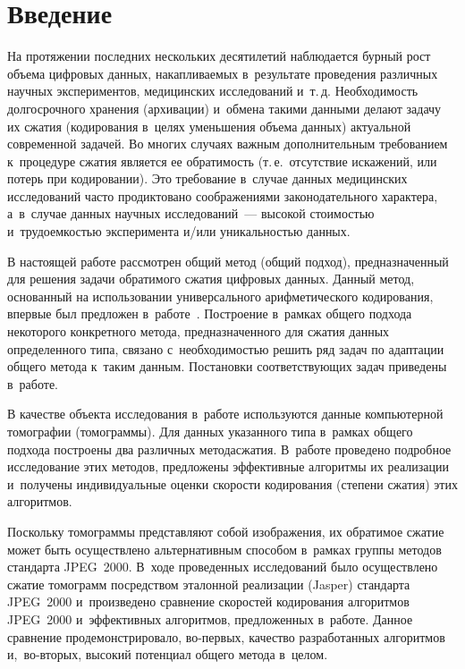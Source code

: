 


\thispagestyle{headings}

\begin{multicols}{2}

\label{st\stat}

\section{Введение}

На протяжении последних нескольких десятилетий наблюдается бурный рост 
объема цифровых данных, накапливаемых в~результате проведения различных 
научных экспериментов, медицинских исследований и~т.\,д. Необходимость долгосрочного 
хранения (архивации) и~обмена такими данными делают задачу их сжатия (кодирования 
в~целях уменьшения объема данных) актуальной современной задачей. Во 
многих случаях важным дополнительным требованием к~процедуре сжатия является 
ее обратимость (т.\,е.\ отсутствие искажений, или потерь при кодировании). 
Это требование в~случае данных медицинских исследований часто продиктовано 
соображениями законодательного характера, а~в~случае данных научных исследований~--- 
высокой стоимостью и~трудоемкостью эксперимента и/или уникальностью данных.

В настоящей работе рассмотрен общий метод (общий подход), 
предназначенный для решения задачи обратимого сжатия цифровых данных. 
Данный метод, основанный на использовании универсального арифметического 
кодирования, впервые был предложен в~работе~\cite{b01}. Построение в~рамках 
общего подхода некоторого конкретного метода, предназначенного для сжатия 
данных определенного типа, связано с~необходимостью решить ряд задач по 
адаптации общего метода к~таким данным. Постановки соответствующих задач 
приведены в~работе.

В качестве объекта исследования в~работе используются данные компьютерной 
томографии (томограммы). Для данных указанного типа в~рамках общего подхода 
построены два различных метода\linebreak сжатия. В~работе проведено подробное 
исследова\-ние этих методов, предложены эффективные алго\-ритмы их реализации и~получены 
индивидуальные оценки скорости кодирования (степени сжатия) этих алгоритмов.

Поскольку томограммы представляют собой изображения, их обратимое сжатие может 
быть осуществлено альтернативным способом в~рамках группы методов стандарта JPEG~2000. 
В~ходе проведенных исследований было осуществлено сжатие томограмм посредством 
эталонной реализации (Jasper) стандарта JPEG~2000 и~произведено сравнение 
скоростей кодирования алгоритмов JPEG~2000 и~эффективных алгоритмов, предложенных 
в~работе. Данное сравнение продемонстрировало, во-пер\-вых, 
качество разработанных алгоритмов и,~во-вто\-рых, высокий потенциал общего 
метода в~целом.


\end{multicols}
